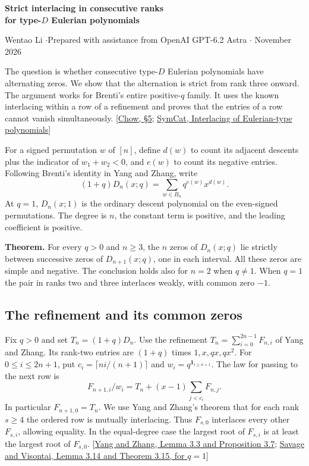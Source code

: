 \documentclass[11pt]{article}
\begin{document}
\begin{center}{\Large\bfseries Strict interlacing in consecutive ranks\\ for type-$D$ Eulerian polynomials}\par
\small Wentao Li \enspace$\cdot$\enspace Prepared with assistance from OpenAI GPT-6.2 Astra \enspace$\cdot$ November 2026\end{center}

The question is whether consecutive type-$D$ Eulerian polynomials have alternating zeros. We show that the alternation is strict from rank three onward. The argument works for Brenti's entire positive-$q$ family. It uses the known interlacing within a row of a refinement and proves that the entries of a row cannot vanish simultaneously. [\href{https://doi.org/10.1016/j.jmaa.2022.126019}{Chow, \S5}; \href{https://www.symmetricfunctions.com/realRootedOpenProblems.htm}{SymCat, Interlacing of Eulerian-type polynomials}]

For a signed permutation $w$ of $[n]$, define $d(w)$ to count its adjacent descents plus the indicator of $w_1+w_2<0$, and $e(w)$ to count its negative entries. Following Brenti's identity in Yang and Zhang, write
\[
 (1+q)D_n(x;q)=\sum_{w\in B_n}q^{e(w)}x^{d(w)}.
\]
At $q=1$, $D_n(x;1)$ is the ordinary descent polynomial on the even-signed permutations. The degree is $n$, the constant term is positive, and the leading coefficient is positive.

\textbf{Theorem.} For every $q>0$ and $n\ge3$, the $n$ zeros of $D_n(x;q)$ lie strictly between successive zeros of $D_{n+1}(x;q)$, one in each interval. All these zeros are simple and negative. The conclusion holds also for $n=2$ when $q\ne1$. When $q=1$ the pair in ranks two and three interlaces weakly, with common zero $-1$.

\subsection*{The refinement and its common zeros}
Fix $q>0$ and set $T_n=(1+q)D_n$. Use the refinement $T_n=\sum_{i=0}^{2n-1}F_{n,i}$ of Yang and Zhang. Its rank-two entries are $(1+q)$ times $1,x,qx,qx^2$. For $0\le i\le 2n+1$, put $c_i=\lceil ni/(n+1)\rceil$ and $w_i=q^{\mathbf1_{i\ge n+1}}$. The law for passing to the next row is
\[
 F_{n+1,i}/w_i=T_n+(x-1)\sum_{j<c_i}F_{n,j}.
 \tag{1}
\]
In particular $F_{n+1,0}=T_n$. We use Yang and Zhang's theorem that for each rank $s\ge4$ the ordered row is mutually interlacing. Thus $F_{s,0}$ interlaces every other $F_{s,i}$, allowing equality. In the equal-degree case the largest root of $F_{s,i}$ is at least the largest root of $F_{s,0}$. [\href{https://arxiv.org/abs/1401.6273}{Yang and Zhang, Lemma 3.3 and Proposition 3.7}; \href{https://arxiv.org/abs/1208.3831}{Savage and Visontai, Lemma 3.14 and Theorem 3.15, for $q=1$}]
\end{document}
